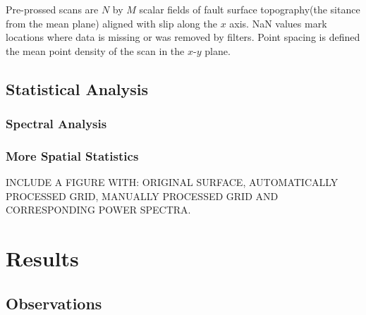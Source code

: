 \documentclass[12pt,a4paper]{article}
\begin{document}
Pre-prossed scans are $N$ by $M$ scalar fields of fault surface topography(the sitance from the mean plane) aligned with slip along the $x$ axis. NaN values mark locations where data is missing or was removed by filters. Point spacing is defined the mean point density of the scan in the $x$-$y$ plane.
	\subsection{Statistical Analysis}
		

		\subsubsection{Spectral Analysis}
		

		\subsubsection{More Spatial Statistics}
	

INCLUDE A FIGURE WITH: ORIGINAL SURFACE, AUTOMATICALLY PROCESSED GRID, MANUALLY PROCESSED GRID AND CORRESPONDING POWER SPECTRA.


\section{Results}

	\subsection{Observations}
\end{document}
